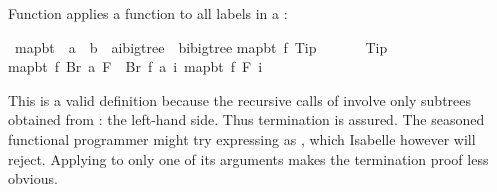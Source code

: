 \begin{isabellebody}
\begin{isamarkuptext}
Function  applies a function to all labels in a :%
\end{isamarkuptext}%
\ map{\isacharunderscore}bt\ {\isacharcolon}{\isacharcolon}\ {\isachardoublequote}{\isacharparenleft}{\isacharprime}a\ {\isasymRightarrow}\ {\isacharprime}b{\isacharparenright}\ {\isasymRightarrow}\ {\isacharparenleft}{\isacharprime}a{\isacharcomma}{\isacharprime}i{\isacharparenright}bigtree\ {\isasymRightarrow}\ {\isacharparenleft}{\isacharprime}b{\isacharcomma}{\isacharprime}i{\isacharparenright}bigtree{\isachardoublequote}\isanewline
{}\isanewline
{\isachardoublequote}map{\isacharunderscore}bt\ f\ Tip\ \ \ \ \ \ {\isacharequal}\ Tip{\isachardoublequote}\isanewline
{\isachardoublequote}map{\isacharunderscore}bt\ f\ {\isacharparenleft}Br\ a\ F{\isacharparenright}\ {\isacharequal}\ Br\ {\isacharparenleft}f\ a{\isacharparenright}\ {\isacharparenleft}{\isasymlambda}i{\isachardot}\ map{\isacharunderscore}bt\ f\ {\isacharparenleft}F\ i{\isacharparenright}{\isacharparenright}{\isachardoublequote}%
\begin{isamarkuptext}%
\noindent This is a valid  definition because the
recursive calls of  involve only subtrees obtained from
: the left-hand side. Thus termination is assured.  The
seasoned functional programmer might try expressing
 as , which Isabelle 
however will reject.  Applying  to only one of its arguments
makes the termination proof less obvious.


\end{isamarkuptext}
\end{isabellebody}
